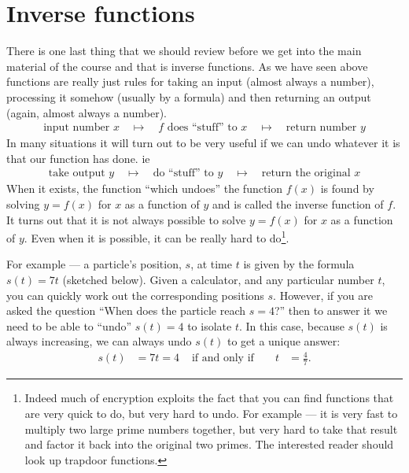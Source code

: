 \section{Inverse functions}\label{sec inverse functions}
There is one last thing that we should review before we get into the main material of the
course and that is inverse functions. As we have seen above functions are really just
rules for taking an input (almost always a number), processing it somehow (usually by a
formula) and then returning an output (again, almost always a number).
\begin{align*}
 \text{input number $x$} \quad \mapsto \quad \text{$f$ does ``stuff'' to $x$} \quad
\mapsto \quad \text{return number $y$}
\end{align*}
In many situations it will turn out to be very useful if we can undo whatever it is that
our function has done. ie
\begin{align*}
 \text{take output $y$} \quad \mapsto \quad \text{do ``stuff'' to $y$}
  \quad \mapsto \quad \text{return the original $x$}
\end{align*}
When it exists, the function ``which undoes'' the function $f(x)$ is found by solving
$y=f(x)$ for $x$ as a function of $y$ and is called the inverse function of $f$.
It turns out that it is not always possible to solve $y=f(x)$ for $x$ as a
function of $y$. Even when it is possible, it can be really hard to
do\footnote{Indeed much of encryption exploits the fact that you can find
functions that are very quick to do, but very hard to undo. For example --- it
is very fast to multiply two large prime numbers together, but very hard to take
that result and factor it back into the original two primes. The interested
reader should look up trapdoor functions.}.


For example --- a particle's position, $s$, at time $t$ is given by the formula
$s(t) = 7t$ (sketched below). Given a calculator, and any particular number $t$,
you can quickly work out the corresponding positions $s$. However, if you are
asked the question ``When does the particle reach $s=4$?'' then to answer it we
need to be able to ``undo'' $s(t)=4$ to isolate $t$. In this case, because
$s(t)$ is always increasing, we can always undo $s(t)$ to get a unique answer:
\begin{align*}
  s(t) &= 7t = 4 & \text{ if and only if }&& t&= \frac{4}{7}.
\end{align*}


